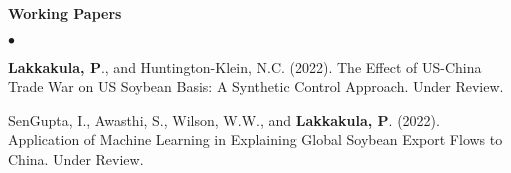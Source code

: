 \documentclass[margin,line]{res}
\newenvironment{list2}{
  \begin{list}{$\bullet$}{%
    \setlength{\itemsep}{0in}
    \setlength{\parsep}{0in} \setlength{\parskip}{0in}
    \setlength{\topsep}{0in} \setlength{\partopsep}{0in}
    \setlength{\leftmargin}{0.2in}}}{\end{list}}
\begin{document}
\begin{resume}
{\bf Working Papers}
\\
\begin{list2}
\item {\bf Lakkakula, P}., and Huntington-Klein, N.C. (2022). The Effect of US-China Trade War on US Soybean Basis: A Synthetic Control Approach. Under Review.

\item SenGupta, I., Awasthi, S., Wilson, W.W., and {\bf Lakkakula, P}. (2022). Application of Machine Learning in Explaining Global Soybean Export Flows to China. Under Review.


\end{list2}
\end{resume}
\end{document}
